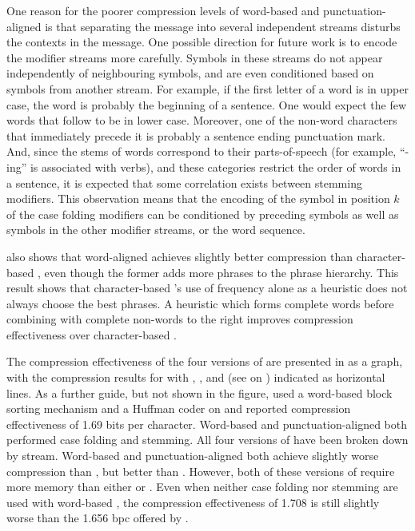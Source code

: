 One reason for the poorer compression levels of word-based and
punctuation-aligned \repair
is that separating the message into several independent streams
disturbs the contexts in the message.  One possible direction
for future work is to encode the modifier streams more carefully.
Symbols in these streams do not appear
independently of neighbouring symbols, and are even conditioned based on
symbols from another stream.  For example, if the first letter of a word
is in upper case, the word is probably the beginning of a sentence.
One would expect the few words that follow to be in lower case.  Moreover, 
one of the non-word characters that immediately precede it is probably
a sentence ending punctuation mark.  And, since the stems of words
correspond to their parts-of-speech (for example, ``-ing'' is 
associated with verbs), and these categories restrict the order of
words in a sentence, it is expected that some correlation exists 
between stemming modifiers.  This observation means that the
encoding of the symbol in position $k$ of the case folding modifiers
can be conditioned by preceding symbols as well as symbols in the
other modifier streams, or the word sequence.

 also shows that word-aligned \repair 
achieves slightly better compression than character-based 
\repair, even though the former adds more phrases to the 
phrase hierarchy.  This result shows that character-based \repair's 
use of frequency alone as a heuristic does not always choose
the best phrases.  A heuristic which forms complete words before 
combining with complete non-words to the right improves compression
effectiveness over character-based \repair.

The compression effectiveness of the four versions of \repair
are presented in  as a graph,
with the compression results for \wsja with \gzip, \bzip, and
\ppmd (see  on ) indicated
as horizontal lines.  As a further guide, but not shown in the
figure, \citet{im01:dcc} used a word-based block sorting
mechanism and a Huffman coder on \wsja and reported 
compression effectiveness of 1.69 bits per character.
Word-based and punctuation-aligned \repair both performed
case folding and stemming.  All four versions of \repair have
been broken down by stream.  Word-based and punctuation-aligned
\repair both achieve slightly worse compression than \bzip, but better than
\gzip.  However, both of these versions of \repair require more
memory than either \bzip or \gzip.  Even when neither case folding nor
stemming are used with word-based \repair, the compression 
effectiveness of 1.708 is still slightly worse than the 1.656 bpc
offered by \ppmd.


